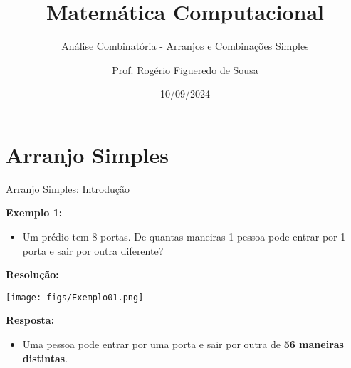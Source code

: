 \documentclass[aspectratio=169]{beamer}
\title{Matemática Computacional}
\subtitle{Análise Combinatória - Arranjos e Combinações Simples}
\author{Prof. Rogério Figueredo de Sousa}
\institute{%
\href{rogerio.sousa@ifpi.edu.br}{rogerio.sousa@ifpi.edu.br}%
}%
\date{10/09/2024}
\begin{document}
\begin{frame}[plain]
    \titlepage
\end{frame}




\jsonp
{}
\section{Arranjo Simples}
\begin{frame}{Arranjo Simples: Introdução}

\textbf{    Exemplo 1:}

    \vspace{4mm}
    \begin{itemize}
        \item[] Um prédio tem 8 portas. De quantas maneiras 1 pessoa pode entrar por 1 porta e sair por outra diferente?
    \end{itemize}

    \pause
    \vspace{4mm}

   \textbf{ Resolução:}

    \begin{center}
        \texttt{[image: figs/Exemplo01.png]}
    \end{center}

    \textbf{Resposta:}

    \begin{itemize}
        \item[] Uma pessoa pode entrar por uma porta e sair por outra de \textbf{56 maneiras distintas}.
    \end{itemize}

\end{frame}
\end{document}

